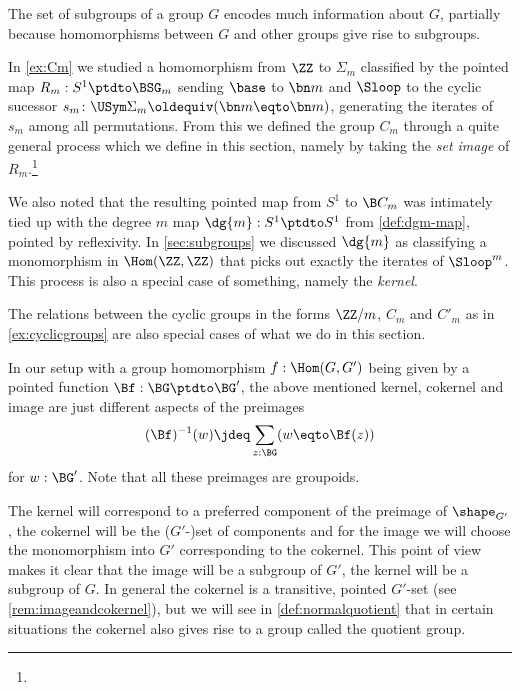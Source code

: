 The set of subgroups of a group $G$ encodes much information about $G$, partially because homomorphisms between $G$ and other groups give rise to subgroups.

In \cref{ex:Cm} we studied a homomorphism from $\ZZ$ to $\Sigma_m$ classified
by the pointed map $R_m:S^1\ptdto \BSG_m$ sending $\base$ to $\bn m$ and
$\Sloop$ to the cyclic sucessor $s_m\colon\USym\Sigma_m\oldequiv(\bn m\eqto\bn m)$, generating the iterates of $s_m$ among all permutations.  From this we defined the group $C_m$ through a quite general process which we define in this section, namely by taking the \emph{set image} of $R_m$.\footnote{%
} 

We also noted that the resulting pointed map from $S^1$ to $\B C_m$ was intimately tied up with the degree $m$ map $\dg{m}:S^1\ptdto S^1$ from \cref{def:dgm-map}, pointed by reflexivity. 
In \cref{sec:subgroups} we discussed $\dg{m}$
as classifying a monomorphism in $\Hom(\ZZ,\ZZ)$ that picks out exactly the iterates of $\Sloop^m$. This process is also a special case of something, namely the \emph{kernel}.

The relations between the cyclic groups in the forms $\ZZ/m$, $C_m$ and $C'_m$ as in \cref{ex:cyclicgroups} are also special cases of  what we do in this section.




In our setup with a group homomorphism
$f:\Hom(G,G')$ being given by a pointed function $\Bf:\BG\ptdto \BG'$, the above mentioned kernel, cokernel and image are just different aspects of the preimages
$$(\Bf)^{-1}(w)\jdeq\sum_{z:\BG}(w\eqto \Bf(z))$$
for $w:\BG'$.  Note that all these preimages are groupoids.

The kernel will correspond to a preferred component of the preimage of $\sh_{G'}$, the cokernel will be the ($G'$-)set of components and for the image we will choose the monomorphism into $G'$ corresponding to the cokernel. This point of view makes it clear that the image will be a subgroup of $G'$, the kernel will be a subgroup of $G$. In general the cokernel is a transitive,
pointed $G'$-set (see \cref{rem:imageandcokernel}),
but we will see in \cref{def:normalquotient} that in certain situations 
the cokernel also gives rise to a group called the quotient group.

